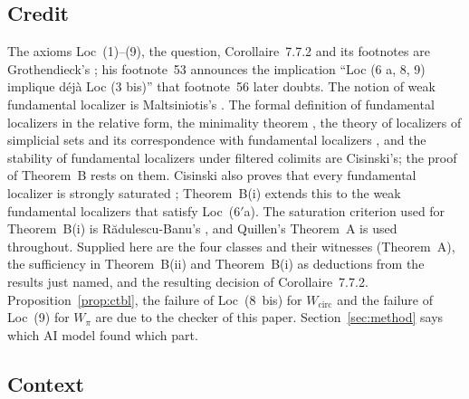 \documentclass[11pt,a4paper]{article}
\theoremstyle{definition}
\newcommand{\Wpi}{W_{\pi}}
\newcommand{\Wcirc}{W_{\mathrm{circ}}}
\begin{document}
\subsection{Credit}\label{subsec:credit}

The axioms Loc~(1)--(9), the question, Corollaire~7.7.2 and its footnotes are Grothendieck's
\cite[XVI]{Der}; his footnote~53 \cite[XVI, p.~53]{Der} announces the implication
``Loc (6 a, 8, 9) implique d\'ej\`a Loc (3 bis)'' that footnote~56 later doubts. The notion of
weak fundamental localizer is Maltsiniotis's \cite[1.1.2]{Mal05}. The formal definition of
fundamental localizers in the relative form, the minimality theorem \cite[Th.~6.1.18]{Cis06},
the theory of localizers of simplicial sets and its correspondence with fundamental
localizers \cite[Th.~4.2.15]{Cis06}, and the stability of fundamental localizers under
filtered colimits \cite[Cor.~4.2.22]{Cis06} are Cisinski's; the proof of Theorem~B rests on
them. Cisinski also proves that every fundamental localizer is strongly saturated
\cite[Prop.~4.2.4]{Cis06}; Theorem~B(i) extends this to the weak fundamental localizers that
satisfy Loc~($6'$a). The saturation criterion used for Theorem~B(i) is Rădulescu-Banu's
\cite[Th.~7.2.7]{RB09}, and Quillen's Theorem~A \cite[\S1]{Qui73} is used throughout. Supplied
here are the four classes and their witnesses (Theorem~A), the sufficiency in Theorem~B(ii)
and Theorem~B(i) as deductions from the results just named, and the resulting decision of
Corollaire~7.7.2. Proposition~\ref{prop:ctbl}, the failure of Loc~(8~bis) for $\Wcirc$ and the
failure of Loc~(9) for $\Wpi$ are due to the checker of this paper. Section~\ref{sec:method}
says which AI model found which part.

\subsection{Context}\label{subsec:context}
\end{document}
